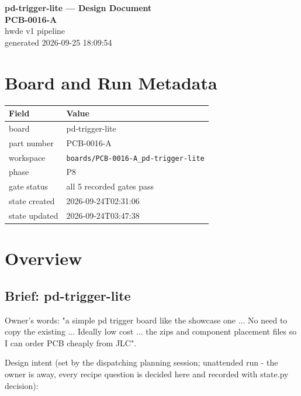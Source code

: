 \documentclass[11pt,a4paper]{article}
\begin{document}
\sloppy
\begin{center}
{\LARGE\bfseries pd-trigger-lite --- Design Document}\\[6pt]
{\Large\bfseries PCB-0016-A}\\[6pt]
{\large hwde v1 pipeline}\\[2pt]
generated 2026-09-25 18:09:54
\end{center}
\tableofcontents

\section{Board and Run Metadata}
{\small
\begin{longtable}{lp{11cm}}
\toprule
\textbf{Field} & \textbf{Value} \\
\midrule
\endhead
board & pd-trigger-lite \\
part number & PCB-0016-A \\
workspace & \texttt{boards/PCB-0016-A\_pd-trigger-lite} \\
phase & P8 \\
gate status & all 5 recorded gates pass \\
state created & 2026-09-24T02:31:06 \\
state updated & 2026-09-24T03:47:38 \\
\bottomrule
\end{longtable}
}
\section{Overview}
\subsection*{Brief: pd-trigger-lite}
Owner's words: "a simple pd trigger board like the showcase one ... No need to copy the existing ... Ideally low cost ... the zips and component placement files so I can order PCB cheaply from JLC".

Design intent (set by the dispatching planning session; unattended run - the owner is away, every recipe question is decided here and recorded with state.py decision):
\end{document}
